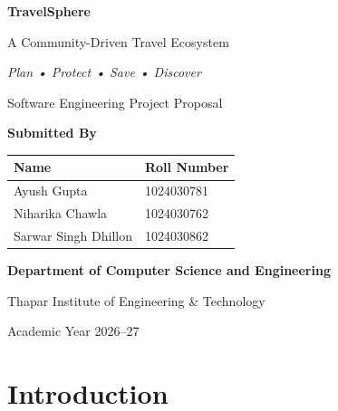 \documentclass[12pt,a4paper]{article}
\begin{document}
\begin{titlepage}

\centering

\vspace*{2cm}

{\Huge\bfseries TravelSphere}

\vspace{0.3cm}

{\Large A Community-Driven Travel Ecosystem}

\vspace{0.3cm}

{\large\textit{Plan • Protect • Save • Discover}}

\vspace{2cm}

{\LARGE Software Engineering Project Proposal}

\vspace{2cm}

\textbf{Submitted By}

\vspace{0.8cm}

\begin{tabular}{ll}
\textbf{Name} & \textbf{Roll Number} \\ \hline
Ayush Gupta & 1024030781 \\
Niharika Chawla & 1024030762 \\
Sarwar Singh Dhillon & 1024030862 \\
\end{tabular}

\vfill

\textbf{Department of Computer Science and Engineering}

\vspace{0.2cm}

Thapar Institute of Engineering \& Technology

\vspace{0.2cm}

Academic Year 2026--27

\end{titlepage}


\tableofcontents

\newpage


\section{Introduction}
\end{document}
